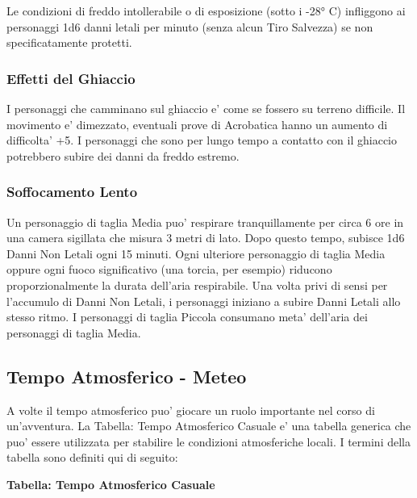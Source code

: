 \documentclass[a4paper,11pt,twoside,openany]{book}
\begin{document}
{Le condizioni di freddo intollerabile o di esposizione (sotto i -28° C) infliggono ai personaggi 1d6 danni letali per minuto (senza alcun Tiro Salvezza) se non specificatamente protetti.

\subsubsection{Effetti del Ghiaccio}

I personaggi che camminano sul ghiaccio e' come se fossero su terreno difficile. Il movimento e' dimezzato, eventuali prove di Acrobatica hanno un aumento di difficolta' +5. I personaggi che sono per lungo tempo a contatto con il ghiaccio potrebbero subire dei danni da freddo estremo.

\subsubsection{Soffocamento Lento}

Un personaggio di taglia Media puo' respirare tranquillamente per circa 6 ore in una camera sigillata che misura 3 metri di lato. Dopo questo tempo, subisce 1d6 Danni Non Letali ogni 15 minuti. Ogni ulteriore personaggio di taglia Media oppure ogni fuoco significativo (una torcia, per esempio) riducono proporzionalmente la durata dell'aria respirabile. Una volta privi di sensi per l'accumulo di Danni Non Letali, i personaggi iniziano a subire Danni Letali allo stesso ritmo. I personaggi di taglia Piccola consumano meta' dell'aria dei personaggi di taglia Media.

\pagebreak

\subsection{Tempo Atmosferico - Meteo}

\label{tempo-atmosferico---meteo}

A volte il tempo atmosferico puo' giocare un ruolo importante nel corso di un'avventura. La Tabella: Tempo Atmosferico Casuale e' una tabella generica che puo' essere utilizzata per stabilire le condizioni atmosferiche locali. I termini della tabella sono definiti qui di seguito:

\bigskip

\textbf{Tabella: Tempo Atmosferico Casuale}

}
\end{document}
